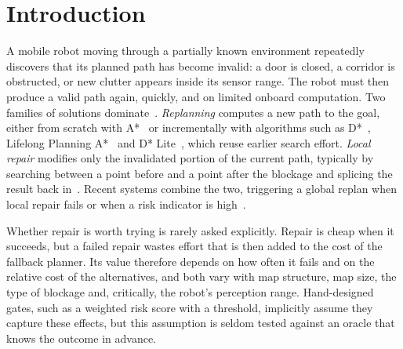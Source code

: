 \documentclass[11pt,a4paper]{article}
\begin{document}
\section{Introduction}
A mobile robot moving through a partially known environment repeatedly discovers that its planned path has become invalid: a door is closed, a corridor is obstructed, or new clutter appears inside its sensor range. The robot must then produce a valid path again, quickly, and on limited onboard computation. Two families of solutions dominate~\cite{lavalle2006,zhou2022review,liu2023review}. \emph{Replanning} computes a new path to the goal, either from scratch with A*~\cite{hart1968} or incrementally with algorithms such as D*~\cite{stentz1994,stentz1995}, Lifelong Planning A*~\cite{koenig2004lpa} and D* Lite~\cite{koenig2002dstarlite,koenig2005fast}, which reuse earlier search effort. \emph{Local repair} modifies only the invalidated portion of the current path, typically by searching between a point before and a point after the blockage and splicing the result back in~\cite{silver2005}. Recent systems combine the two, triggering a global replan when local repair fails or when a risk indicator is high~\cite{stracca2026,xu2026,pan2026,sharma2026,cui2026}.

Whether repair is worth trying is rarely asked explicitly. Repair is cheap when it succeeds, but a failed repair wastes effort that is then added to the cost of the fallback planner. Its value therefore depends on how often it fails and on the relative cost of the alternatives, and both vary with map structure, map size, the type of blockage and, critically, the robot's perception range. Hand-designed gates, such as a weighted risk score with a threshold, implicitly assume they capture these effects, but this assumption is seldom tested against an oracle that knows the outcome in advance.
\end{document}
